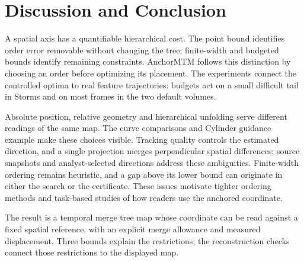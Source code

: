 \documentclass[review]{vgtc}
\begin{document}
\section{Discussion and Conclusion}\label{sec:discussion}
A spatial axis has a quantifiable hierarchical cost. The point bound identifies order error removable without changing the tree; finite-width and budgeted bounds identify remaining constraints. AnchorMTM follows this distinction by choosing an order before optimizing its placement. The experiments connect the controlled optima to real feature trajectories: budgets act on a small difficult tail in Storms and on most frames in the two default volumes.

Absolute position, relative geometry and hierarchical unfolding serve different readings of the same map. The curve comparisons and Cylinder guidance example make these choices visible. Tracking quality controls the estimated direction, and a single projection merges perpendicular spatial differences; source snapshots and analyst-selected directions address these ambiguities. Finite-width ordering remains heuristic, and a gap above its lower bound can originate in either the search or the certificate. These issues motivate tighter ordering methods and task-based studies of how readers use the anchored coordinate.

The result is a temporal merge tree map whose coordinate can be read against a fixed spatial reference, with an explicit merge allowance and measured displacement. Three bounds explain the restrictions; the reconstruction checks connect those restrictions to the displayed map.



\FloatBarrier
\begingroup
{}


\endgroup
\end{document}
